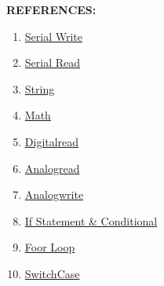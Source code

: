 \documentclass[12pt,a4paper]{article}
\begin{document}
\setlength{\parindent}{0eM}
\begin{justify}
\noindent \textbf{\large REFERENCES:}
\vspace{-3mm}
\begin{enumerate}
 \setlength\itemsep{-0.3em}
 
\item \href{https://www.arduino.cc/reference/en/language/functions/communication/serial/write/}{Serial Write}

\item \href{https://www.arduino.cc/reference/en/language/functions/communication/serial/read}{Serial Read}

\item \href{https://www.arduino.cc/reference/en/language/variables/data-types/string/}{String}

\item \href{https://www.arduino.cc/en/math/h}{Math}

\item \href{https://www.arduino.cc/reference/en/language/functions/digital-io/digitalread}{Digitalread }


\item \href{https://www.arduino.cc/reference/en/language/functions/analog-io/analogread/}{Analogread }

\item \href{https://www.arduino.cc/reference/en/language/functions/analog-io/analogwrite/}{Analogwrite}

\item \href{https://www.arduino.cc/en/Tutorial/BuiltInExamples/ifStatementConditional}{If Statement \& Conditional }


\item \href{https:/www.arduino.cc/en/Tutorial/BuiltInExamples/ForLoopIteration}{Foor Loop}

\item \href{https://docs.arduino.cc/built-in-examples/control-structures/SwitchCase2}{SwitchCase}

\end{enumerate}


\end{justify}
\end{document}
